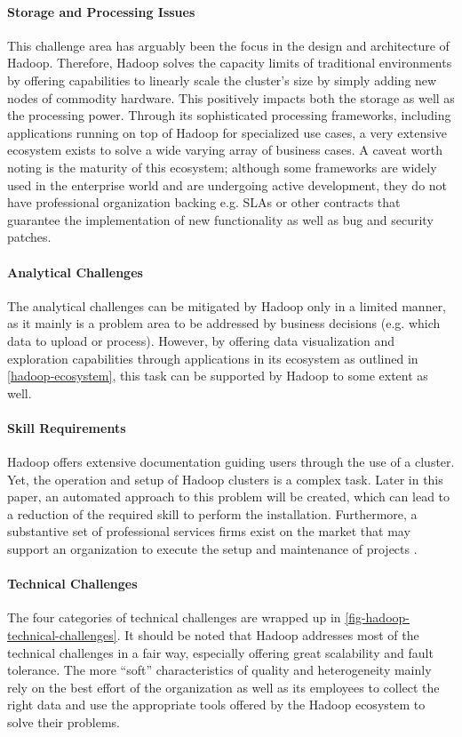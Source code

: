 \paragraph{Storage and Processing Issues}
This challenge area has arguably been the focus in the design and architecture of Hadoop. Therefore, Hadoop solves the capacity limits of traditional environments by offering capabilities to linearly scale the cluster's size by simply adding new nodes of commodity hardware. This positively impacts both the storage as well as the processing power. Through its sophisticated processing frameworks, including applications running on top of Hadoop for specialized use cases, a very extensive ecosystem exists to solve a wide varying array of business cases. A caveat worth noting is the maturity of this ecosystem; although some frameworks are widely used in the enterprise world and are undergoing active development, they do not have professional organization backing e.g. \acp{SLA} or other contracts that guarantee the implementation of new functionality as well as bug and security patches.

\paragraph{Analytical Challenges}
The analytical challenges can be mitigated by Hadoop only in a limited manner, as it mainly is a problem area to be addressed by business decisions (e.g. which data to upload or process). However, by offering data visualization and exploration capabilities through applications in its ecosystem as outlined in \vref{hadoop-ecosystem}, this task can be supported by Hadoop to some extent as well.

\paragraph{Skill Requirements}
Hadoop offers extensive documentation guiding users through the use of a cluster. Yet, the operation and setup of Hadoop clusters is a complex task. Later in this paper, an automated approach to this problem will be created, which can lead to a reduction of the required skill to perform the installation.
Furthermore, a substantive set of professional services firms exist on the market that may support an organization to execute the setup and maintenance of projects \autocite{hadoopconsulting}. 

\paragraph{Technical Challenges}
The four categories of technical challenges are wrapped up in \autoref{fig-hadoop-technical-challenges}. It should be noted that Hadoop addresses most of the technical challenges in a fair way, especially offering great scalability and fault tolerance. The more \enquote{soft} characteristics of quality and heterogeneity mainly rely on the best effort of the organization as well as its employees to collect the right data and use the appropriate tools offered by the Hadoop ecosystem to solve their problems.

